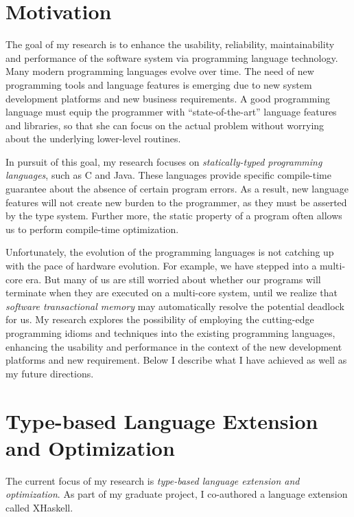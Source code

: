 \documentclass[12pt]{article}
\theoremstyle{plain} \numberwithin{equation}{section}
\theoremstyle{definition}
\newcommand{\kl}[1]{}
\begin{document}
\raisebox{1cm}

\section{Motivation}

\kl{What is the goal of my research?}
The goal of my research is to enhance the usability, reliability, 
maintainability and performance of the software system via programming language
technology. Many modern programming languages evolve over time.
The need of new programming tools and language features is 
emerging due to new system development platforms and new 
business requirements. A good programming language must equip
the programmer with ``state-of-the-art'' language features
and libraries, so that she can focus on the actual problem without
worrying about the underlying lower-level routines.

\kl{What is the focus?}
In pursuit of this goal, my research focuses on {\em statically-typed
programming languages}, such as C and Java. These languages
provide specific compile-time guarantee about the absence of certain
program errors. As a result, new language features will not create new
burden to the programmer, as they must be asserted by the type system.
Further more, the static property of a program often allows us 
to perform compile-time optimization. 

\kl{What is the problem?}
Unfortunately, the evolution of the programming languages 
is not catching up with the pace of hardware evolution.
For example, we have stepped into a multi-core era.
But many of us are still worried about whether our programs will terminate when they are executed on a multi-core system, until we realize
that {\em software transactional memory} \cite{stm} may automatically 
resolve the potential deadlock for us. 
My research explores the possibility of employing the cutting-edge
programming idioms and techniques into the existing 
programming languages, enhancing the usability and performance
in the context of the new development platforms and new requirement. 
Below I describe what I have achieved as well as my future directions.


\section{Type-based Language Extension and Optimization}

The current focus of my research is {\em type-based language 
extension and optimization}. As part of my 
graduate project, I co-authored a language extension called XHaskell.
\end{document}
